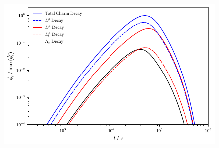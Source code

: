 \begin{figure}[H]
	\centering
	\includegraphics{../plots/build/magnetar_charm_decay_comparison_without.pdf}
	\caption[]{}
	\label{fig:magnetar-charm-comparison-without}
\end{figure}
